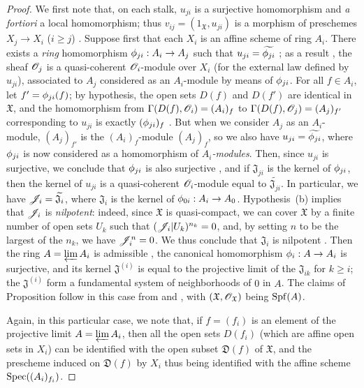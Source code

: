 \begin{proof}
\label{proof-1.10.6.3}
We first note that, on each stalk, $u_{ji}$ is a surjective homomorphism and \emph{a fortiori} a local homomorphism; thus $v_{ij}=(1_\mathfrak{X},u_{ji})$ is a morphism of preschemes $X_j\to X_i$ ($i\geq j$) .
Suppose first that each $X_i$ is an affine scheme of ring $A_i$.
There exists a \emph{ring} homomorphism $\vphi_{ji}:A_i\to A_j$ such that $u_{ji}=\widetilde{\phi_{ji}}$ ; as a result , the sheaf $\mathscr{O}_j$ is a quasi-coherent $\mathscr{O}_i$-module over $X_i$ (for the external law defined by $u_{ji}$), associated to $A_j$ considered as an $A_i$-module by means of $\phi_{ji}$.
For all $f\in A_i$, let $f'=\phi_{ji}(f)$; by hypothesis, the open sets $D(f)$ and $D(f')$ are identical in $\mathfrak{X}$, and the homomorphism from $\Gamma(D(f),\mathscr{O}_i)=(A_i)_f$ to $\Gamma(D(f),\mathscr{O}_j)=(A_j)_{f'}$ corresponding to $u_{ji}$ is exactly $(\phi_{ji})_f$ .
But when we consider $A_j$ as an $A_i$-module, $(A_j)_{f'}$ is the $(A_i)_f$-module $(A_j)_f$, so we also have $u_{ji}=\widetilde{\phi_{ji}}$, where $\phi_{ji}$ is now considered as a homomorphism of \emph{$A_i$-modules}.
Then, since $u_{ji}$ is surjective, we conclude that $\phi_{ji}$ is also surjective , and if $\mathfrak{J}_{ji}$ is the kernel of $\phi_{ji}$, then the kernel of $u_{ji}$ is a quasi-coherent $\mathscr{O}_i$-module equal to $\widetilde{\mathfrak{J}_{ji}}$.
In particular, we have $\mathscr{J}_i=\widetilde{\mathfrak{J}_i}$, where $\mathfrak{J}_i$ is the kernel of $\vphi_{0i}:A_i\to A_0$.
Hypothesis~(b) implies that $\mathscr{J}_i$ is \emph{nilpotent}: indeed, since $\mathfrak{X}$ is quasi-compact, we can cover $\mathfrak{X}$ by a finite number of open sets $U_k$ such that $(\mathscr{J}_i|U_k)^{n_k}=0$, and, by setting $n$ to be the largest of the $n_k$, we have $\mathscr{J}_i^n=0$.
We thus conclude that $\mathfrak{J}_i$ is nilpotent .
Then the ring $A=\varprojlim A_i$ is admissible , the canonical homomorphism $\vphi_i:A\to A_i$ is surjective, and its kernel $\mathfrak{J}^{(i)}$ is equal to the projective limit of the $\mathfrak{J}_{ik}$ for $k\geq i$; the $\mathfrak{J}^{(i)}$ form a fundamental system of neighborhoods of $0$ in $A$.
The claims of Proposition  follow in this case from  and , with $(\mathfrak{X},\mathscr{O}_\mathfrak{X})$ being $\operatorname{Spf}(A)$.

Again, in this particular case, we note that, if $f=(f_i)$ is an element of the projective limit $A=\varprojlim A_i$, then all the open sets $D(f_i)$ (which are affine open sets in $X_i$) can be identified with the open subset $\mathfrak{D}(f)$ of $\mathfrak{X}$, and the prescheme induced on $\mathfrak{D}(f)$ by $X_i$ thus being identified with the affine scheme $\operatorname{Spec}((A_i)_{f_i})$.


\end{proof}
